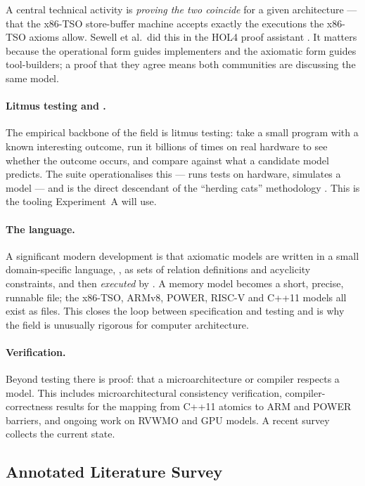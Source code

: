 A central technical activity is \emph{proving the two coincide} for a given
architecture --- that the x86-TSO store-buffer machine accepts exactly the
executions the x86-TSO axioms allow.
Sewell et al.\ did this in the HOL4 proof assistant \cite{sewell2010x86tso}.
It matters because the operational form guides implementers and the axiomatic
form guides tool-builders; a proof that they agree means both communities are
discussing the same model.

\paragraph{Litmus testing and .}
The empirical backbone of the field is litmus testing: take a small program with
a known interesting outcome, run it billions of times on real hardware to see
whether the outcome occurs, and compare against what a candidate model predicts.
The  suite operationalises this ---  runs tests on
hardware,  simulates a model --- and is the direct descendant of the
``herding cats'' methodology \cite{alglave2014herding}.
This is the tooling Experiment~A will use.

\paragraph{The  language.}
A significant modern development is that axiomatic models are written in a small
domain-specific language, , as sets of relation definitions and
acyclicity constraints, and then \emph{executed} by .
A memory model becomes a short, precise, runnable file; the x86-TSO, ARMv8,
POWER, RISC-V and C++11 models all exist as  files.
This closes the loop between specification and testing and is why the field is
unusually rigorous for computer architecture.

\paragraph{Verification.}
Beyond testing there is proof: that a microarchitecture or compiler respects a
model.
This includes microarchitectural consistency verification, compiler-correctness
results for the mapping from C++11 atomics to ARM and POWER barriers, and
ongoing work on RVWMO and GPU models.
A recent survey \cite{weakmemory2025survey} collects the current state.

\subsection{Annotated Literature Survey}

